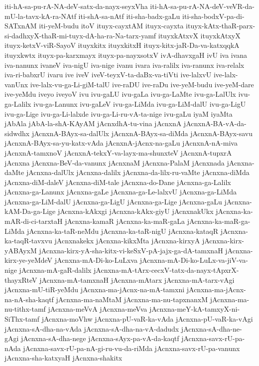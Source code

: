 {iti-hA-sa-pu-rA-NA-deV-satx-da-nayx-seyxVha
iti-hA-sa-pu-rA-NA-deV-veVR-da-mU-la-tavx-kA-ra-NAtf
iti-shA-sa-nAtf
iti-sha-badx-gaLu
iti-sha-bodxV-pa-di-SATxnAM
iti-yeM-budu
itoV
ituyx-cayxtAM
ituyx-cayxta
ituyx-kAtx-thaR-parx-si-dadhxyX-thaR-mi-tuyx-dA-ha-ra-Na-tarx-yamf
ituyxkAtxvX
ituyxkAtxyX
ituyx-ketxV-viR-SayoV
ituyxkitx
ituyxkitxH
ituyx-kitx-jaR-Da-va-katxqqkA
ituyxkwtx
ituyx-pa-karxmayx
ituyx-pa-nayxsotxV
ivA-dhavxgaH
ivU
iva
ivana
iva-nanunx
ivaneV
iva-nigU
iva-nige
ivanu
ivara
iva-ralilx
iva-ranunx
iva-relalx
iva-ri-babxrU
ivaru
ive
iveV
iveV-teyxV-ta-daBx-va-tiVti
ive-lalxvU
ive-lalx-vanUnx
ive-lalx-vu-ga-Li-giM-talU
ive-raDU
ive-raDu
ive-yeM-budu
ive-yeM-dare
ive-yeMdu
iveyo
iveyoV
ivu
ivu-gaLU
ivu-gaLa
ivu-ga-LaMte
ivu-ga-LalUlx
ivu-ga-Lalilx
ivu-ga-Lanunx
ivu-gaLeV
ivu-ga-LiMda
ivu-ga-LiM-dalU
ivu-ga-LigU
ivu-ga-Lige
ivu-ga-Li-lalxde
ivu-ga-Li-ru-vA-ta-nige
ivu-gaLu
iyaM
iyaMta
jAbAla
jAbA-la-shA-KAyAM
jAcnxdhA-tu-vina
jAcnxnA
jAcnxnA-BA-vA-da-sidwdhx
jAcnxnA-BAyx-sa-dalUlx
jAcnxnA-BAyx-sa-diMda
jAcnxnA-BAyx-savu
jAcnxnA-BAyx-sa-yu-katx-vAda
jAcnxnA-jAcnx-na-gaLu
jAcnxnA-nA-miva
jAcnxnA-tamxnoV
jAcnxnA-tekxY-va-layx-ma-shunxteV
jAcnxnA-tupxrA
jAcnxna
jAcnxna-BeV-da-vanunx
jAcnxnaM
jAcnxna-PalaM
jAcnxnada
jAcnxna-daMte
jAcnxna-dalUlx
jAcnxna-dalilx
jAcnxna-da-lilx-ru-vaMte
jAcnxna-diMda
jAcnxna-diM-daleV
jAcnxna-diM-tale
jAcnxna-do-Dane
jAcnxna-ga-Lalilx
jAcnxna-ga-Lanunx
jAcnxna-gaLe
jAcnxna-ga-Le-lalxvU
jAcnxna-ga-LiMda
jAcnxna-ga-LiM-dalU
jAcnxna-ga-LigU
jAcnxna-ga-Lige
jAcnxna-gaLu
jAcnxna-kAM-Da-ga-Lige
jAcnxna-kAkxgi
jAcnxna-kAkx-giyU
jAcnxnakUkx
jAcnxna-ka-mAR-di-ci-tarxtaH
jAcnxna-kamaR
jAcnxna-ka-maR-gaLa
jAcnxna-ka-maR-ga-LiMda
jAcnxna-ka-taR-neMdu
jAcnxna-ka-taR-nigU
jAcnxna-kataqR
jAcnxna-ka-taqR-tavxvu
jAcnxnakekx
jAcnxna-kikxMta
jAcnxna-kirxyA
jAcnxna-kirx-yABAyxM
jAcnxna-kirx-yA-sha-kitx-vi-keSxV-pA-jajx-ga-dA-tamxnaH
jAcnxna-kirx-ye-yeMdeV
jAcnxna-mA-Di-ko-LuLxva
jAcnxna-mA-Di-ko-LuLx-va-jiV-va-nige
jAcnxna-mA-gaR-dalilx
jAcnxna-mA-tArx-cecxV-tatx-da-nayx-tApxrX-thayxRteV
jAcnxna-mA-tamxnaH
jAcnxna-mAtarx
jAcnxna-mA-tarx-vAgi
jAcnxna-mU-tiR-yeMdu
jAcnxna-ma-jAcnx-na-mA-tamxni
jAcnxna-ma-jAcnx-na-nA-sha-kaqtf
jAcnxna-ma-naMtaM
jAcnxna-ma-nu-tapxnanxM
jAcnxna-ma-nu-tithx-tamf
jAcnxna-meVvA
jAcnxna-meVva
jAcnxna-meY-kA-tamxyX-ni-SiThx-tamf
jAcnxna-moVhw
jAcnxna-pU-vaR-ka-vAda
jAcnxna-pU-vaR-ka-vAgi
jAcnxna-sA-dha-na-vAda
jAcnxna-sA-dha-na-vA-dadudx
jAcnxna-sA-dha-ne-gAgi
jAcnxna-sA-dha-nege
jAcnxna-sAyx-pa-vA-da-kaqtf
jAcnxna-savx-rU-pa-nAda
jAcnxna-savx-rU-pa-nA-gi-ru-vu-da-riMda
jAcnxna-savx-rU-pa-vanunx
jAcnxna-sha-katxyaH
jAcnxna-shakitx
}
